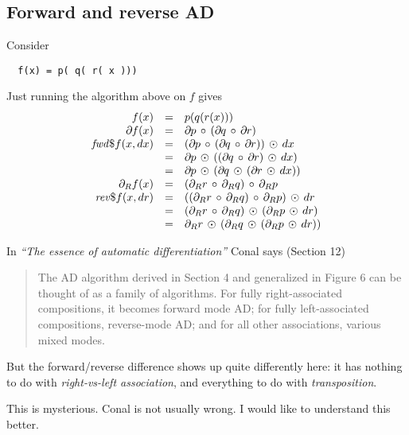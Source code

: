 \documentclass[sigplan,review]{acmart}
\newcommand{\deriv}{\partial}  %
\newcommand{\gradf}[1]{\deriv\hspace{-0.15mm} #1}  %
\newcommand{\gradft}[1]{\deriv_R#1}  %
\newcommand{\fwdDf}[1]{\mathit{fwd\$}#1}  %
\newcommand{\revDf}[1]{\mathit{rev\$}#1}  %
\newcommand{\lmcomp}{\,\circ\,}   %
\newcommand{\lmapply}{\,\odot\,}      %
\newcommand{\tom}[1]{}
\begin{document}
\subsection{Forward and reverse AD}

Consider
\begin{lstlisting}
  f(x) = p( q( r( x )))
\end{lstlisting}
Just running the algorithm above on $f$ gives
$$
\begin{array}{rcl}
  f(x)  & = & p( q( r( x ))) \\
  \gradf{f}(x) & = & \gradf{p} \lmcomp (\gradf{q} \lmcomp \gradf{r}) \\
  \fwdDf{f}(x,dx) & = & (\gradf{p} \lmcomp (\gradf{q} \lmcomp \gradf{r})) \lmapply dx \\
  & = & \gradf{p} \lmapply ((\gradf{q} \lmcomp \gradf{r}) \lmapply dx) \\
  & = & \gradf{p} \lmapply (\gradf{q} \lmapply (\gradf{r} \lmapply dx)) \\
  \gradft{f}(x) & = & (\gradft{r} \lmcomp \gradft{q}) \lmcomp \gradft{p} \\
  \revDf{f}(x,dr) & = & ((\gradft{r} \lmcomp \gradft{q}) \lmcomp \gradft{p}) \lmapply dr \\
     & = & (\gradft{r} \lmcomp \gradft{q}) \lmapply (\gradft{p} \lmapply dr) \\
     & = & \gradft{r} \lmapply (\gradft{q} \lmapply (\gradft{p} \lmapply dr)) \\
\end{array}
$$

In \emph{``The essence of automatic differentiation''} Conal says (Section 12)
\begin{quote}
The AD algorithm derived in Section 4 and generalized in Figure 6 can be thought of as a family
of algorithms. For fully right-associated compositions, it becomes forward mode AD; for fully
left-associated compositions, reverse-mode AD; and for all other associations, various mixed modes.
\end{quote}
But the forward/reverse difference shows up quite differently here: it has nothing to do
with \emph{right-vs-left association}, and everything to do with \emph{transposition}.

This is mysterious.  Conal is not usually wrong.  I would like to
understand this better.
\tom{I was also puzzled by this.  Conal's claim is suspicious to me,
  but firstly it's very cool and secondly it's Conal, so I want it to
  be true and I still hope it is.}
\end{document}
